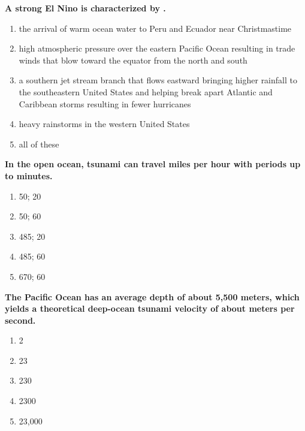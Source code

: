 \item {
\setlength{\itemsep}{0cm}
\setlength{\parskip}{.2cm}
\begin{samepage}
\textbf{
A strong El Nino is characterized by \makebox[1cm]{\Rivpt\hrulefill\Rivpt}.
}
\begin{enumerate}
\item {  the arrival of warm ocean water to Peru and Ecuador near Christmastime }
\item {  high atmospheric pressure over the eastern Pacific Ocean resulting in trade winds that blow toward the equator from the north and south }
\item {  a southern jet stream branch that flows eastward bringing higher rainfall to the southeastern United States and helping break apart Atlantic and Caribbean storms resulting in fewer hurricanes }
\item {  heavy rainstorms in the western United States }
\item {  all of these }
\end{enumerate}
\end{samepage}
}
\item {
\setlength{\itemsep}{0cm}
\setlength{\parskip}{.2cm}
\begin{samepage}
\textbf{
In the open ocean, tsunami can travel \makebox[1cm]{\Rivpt\hrulefill\Rivpt} miles per hour with periods up to \makebox[1cm]{\Rivpt\hrulefill\Rivpt} minutes.
}
\begin{enumerate}
\item { 	50; 20 }
\item { 	50; 60 }
\item { 	485; 20 }
\item { 	485; 60 }
\item { 	670; 60 		 }
\end{enumerate}
\end{samepage}
}
\item {
\setlength{\itemsep}{0cm}
\setlength{\parskip}{.2cm}
\begin{samepage}
\textbf{
The Pacific Ocean has an average depth of about 5,500 meters, which yields a theoretical deep-ocean tsunami velocity of about \makebox[1cm]{\Rivpt\hrulefill\Rivpt} meters per second.
}
\begin{enumerate}
\item { 	2 }
\item { 	23 }
\item { 	230 }
\item { 	2300 }
\item { 	23,000 		 }
\end{enumerate}
\end{samepage}
}
